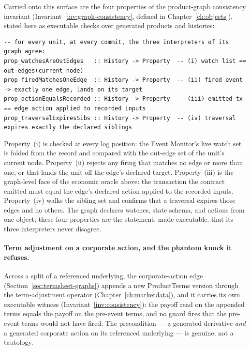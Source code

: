\documentclass[11pt,a4paper]{article}
\begin{document}
Carried onto this surface are the four properties of the product-graph consistency invariant
(Invariant~\ref{inv:graph-consistency}, defined in Chapter~\ref{ch:objects}), stated here as
executable checks over generated products and histories:

\begin{lstlisting}
-- for every unit, at every commit, the three interpreters of its graph agree:
prop_watchesAreOutEdges   :: History -> Property  -- (i) watch list == out-edges(current node)
prop_firedMatchesOneEdge  :: History -> Property  -- (ii) fired event -> exactly one edge, lands on its target
prop_actionEqualsRecorded :: History -> Property  -- (iii) emitted tx == edge action applied to recorded inputs
prop_traversalExpiresSibs :: History -> Property  -- (iv) traversal expires exactly the declared siblings
\end{lstlisting}

Property~(i) is checked at every log position: the Event Monitor's live watch set is folded
from the record and compared with the out-edge set of the unit's current node. Property~(ii)
rejects any firing that matches no edge or more than one, or that lands the unit off the
edge's declared target. Property~(iii) is the graph-level face of the economic oracle above:
the transaction the contract emitted must equal the edge's declared action applied to the
recorded inputs. Property~(iv) walks the sibling set and confirms that a traversal expires
those edges and no others. The graph declares watches, state schema, and actions from one
object; these four properties are the statement, made executable, that its three interpreters
never disagree.

\paragraph{Term adjustment on a corporate action, and the phantom knock it refuses.}
Across a split of a referenced underlying, the corporate-action edge
(Section~\ref{sec:termsheet-graphs}) appends a new ProductTerms version through the
term-adjustment operator (Chapter~\ref{ch:marketdata}), and it carries its own executable
witness (Invariant~\ref{inv:consistency}): the payoff read on the appended terms equals the
payoff on the pre-event terms, and no guard fires that the pre-event terms would not have
fired. The precondition --- a generated derivative \emph{and} a generated corporate action
on its referenced underlying --- is genuine, not a tautology.
\end{document}
